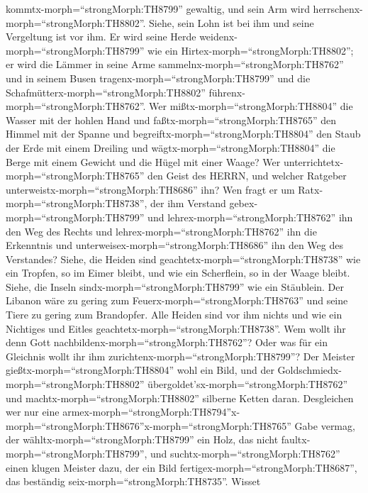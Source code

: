kommtx-morph=``strongMorph:TH8799'' gewaltig, und sein Arm wird
herrschenx-morph=``strongMorph:TH8802''. Siehe, sein Lohn ist bei ihm
und seine Vergeltung ist vor ihm.  Er wird seine Herde
weidenx-morph=``strongMorph:TH8799'' wie ein
Hirtex-morph=``strongMorph:TH8802''; er wird die Lämmer in seine Arme
sammelnx-morph=``strongMorph:TH8762'' und in seinem Busen
tragenx-morph=``strongMorph:TH8799'' und die
Schafmütterx-morph=``strongMorph:TH8802''
führenx-morph=``strongMorph:TH8762''.  Wer
mißtx-morph=``strongMorph:TH8804'' die Wasser mit der hohlen Hand und
faßtx-morph=``strongMorph:TH8765'' den Himmel mit der Spanne und
begreiftx-morph=``strongMorph:TH8804'' den Staub der Erde mit einem
Dreiling und wägtx-morph=``strongMorph:TH8804'' die Berge mit einem
Gewicht und die Hügel mit einer Waage?  Wer
unterrichtetx-morph=``strongMorph:TH8765'' den Geist des HERRN, und
welcher Ratgeber unterweistx-morph=``strongMorph:TH8686'' ihn?
 Wen fragt er um Ratx-morph=``strongMorph:TH8738'', der ihm
Verstand gebex-morph=``strongMorph:TH8799'' und
lehrex-morph=``strongMorph:TH8762'' ihn den Weg des Rechts und
lehrex-morph=``strongMorph:TH8762'' ihn die Erkenntnis und
unterweisex-morph=``strongMorph:TH8686'' ihn den Weg des Verstandes?
 Siehe, die Heiden sind
geachtetx-morph=``strongMorph:TH8738'' wie ein Tropfen, so im Eimer
bleibt, und wie ein Scherflein, so in der Waage bleibt. Siehe, die
Inseln sindx-morph=``strongMorph:TH8799'' wie ein Stäublein.
 Der Libanon wäre zu gering zum
Feuerx-morph=``strongMorph:TH8763'' und seine Tiere zu gering zum
Brandopfer.  Alle Heiden sind vor ihm nichts und wie ein
Nichtiges und Eitles geachtetx-morph=``strongMorph:TH8738''.
 Wem wollt ihr denn Gott
nachbildenx-morph=``strongMorph:TH8762''? Oder was für ein Gleichnis
wollt ihr ihm zurichtenx-morph=``strongMorph:TH8799''?  Der
Meister gießtx-morph=``strongMorph:TH8804'' wohl ein Bild, und der
Goldschmiedx-morph=``strongMorph:TH8802''
übergoldet'sx-morph=``strongMorph:TH8762'' und
machtx-morph=``strongMorph:TH8802'' silberne Ketten daran. 
Desgleichen wer nur eine
armex-morph=``strongMorph:TH8794''\textbar x-morph=``strongMorph:TH8676''x-morph=``strongMorph:TH8765''
Gabe vermag, der wähltx-morph=``strongMorph:TH8799'' ein Holz, das nicht
faultx-morph=``strongMorph:TH8799'', und
suchtx-morph=``strongMorph:TH8762'' einen klugen Meister dazu, der ein
Bild fertigex-morph=``strongMorph:TH8687'', das beständig
seix-morph=``strongMorph:TH8735''.  Wisset
